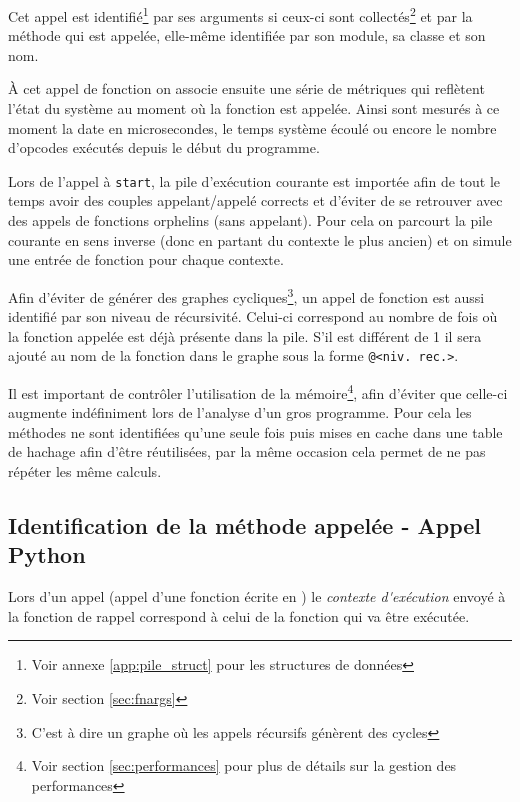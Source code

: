 Cet appel est identifié\footnote{Voir annexe \vref{app:pile_struct} pour les structures de données} par ses arguments si ceux-ci sont collectés\footnote{Voir section \vref{sec:fnargs}} et par la méthode qui est appelée, elle-même identifiée par son module, sa classe et son nom. 

À cet appel de fonction on associe ensuite une série de métriques qui reflètent l'état du système au moment où la fonction est appelée. Ainsi sont mesurés à ce moment la date en microsecondes, le temps système écoulé ou encore le nombre d'opcodes exécutés depuis le début du programme.

\begin{note}
Lors de l'appel à \verb|start|, la pile d'exécution courante est importée afin de tout le temps avoir des couples appelant/appelé corrects et d'éviter de se retrouver avec des appels de fonctions orphelins (sans appelant). Pour cela on parcourt la pile courante en sens inverse (donc en partant du contexte le plus ancien) et on simule une entrée de fonction pour chaque contexte.
\end{note}

\begin{note}
Afin d'éviter de générer des graphes cycliques\footnote{C'est à dire un graphe où les appels récursifs génèrent des cycles}, un appel de fonction est aussi identifié par son niveau de récursivité. Celui-ci correspond au nombre de fois où la fonction appelée est déjà présente dans la pile. S'il est différent de 1 il sera ajouté au nom de la fonction dans le graphe sous la forme \verb|@<niv. rec.>|.
\end{note}

\begin{note}[Performances]
Il est important de contrôler l'utilisation de la mémoire\footnote{Voir section \vref{sec:performances} pour plus de détails sur la gestion des performances}, afin d'éviter que celle-ci augmente indéfiniment lors de l'analyse d'un gros programme. Pour cela les méthodes ne sont identifiées qu'une seule fois puis mises en cache dans une table de hachage afin d'être réutilisées, par la même occasion cela permet de ne pas répéter les même calculs.
\end{note}

\subsection{Identification de la méthode appelée - Appel Python}
\label{ident-python}
Lors d'un appel \Python (appel d'une fonction écrite en \Python) le \emph{\gls{contexte d'exécution}} envoyé à la fonction de rappel correspond à celui de la fonction qui va être exécutée.

